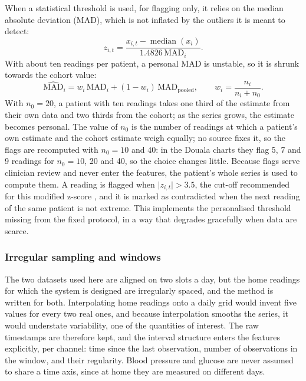 When a statistical threshold is used, for flagging only, it relies on the median absolute deviation (MAD), which is not inflated by the outliers it is meant to detect:
\begin{equation}
  z_{i,t} = \frac{x_{i,t} - \operatorname{median}(x_i)}{1.4826\,\mathrm{MAD}_i}.
\end{equation}
With about ten readings per patient, a personal MAD is unstable, so it is shrunk towards the cohort value:
\begin{equation}
  \widehat{\mathrm{MAD}}_i = w_i\,\mathrm{MAD}_i + (1-w_i)\,\mathrm{MAD}_{\text{pooled}},
  \qquad w_i = \frac{n_i}{n_i + n_0}.
\end{equation}
With $n_0 = 20$, a patient with ten readings takes one third of the estimate from their own data and two thirds from the cohort; as the series grows, the estimate becomes personal. The value of $n_0$ is the number of readings at which a patient's own estimate and the cohort estimate weigh equally; no source fixes it, so the flags are recomputed with $n_0 = 10$ and $40$: in the Douala charts they flag 5, 7 and 9 readings for $n_0 = 10$, 20 and 40, so the choice changes little. Because flags serve clinician review and never enter the features, the patient's whole series is used to compute them. A reading is flagged when $\lvert z_{i,t}\rvert > 3.5$, the cut-off recommended for this modified z-score \parencite{iglewicz1993}, and it is marked as contradicted when the next reading of the same patient is not extreme. This implements the personalised threshold missing from the fixed protocol, in a way that degrades gracefully when data are scarce.

\subsubsection{Irregular sampling and windows}\label{sec:irregular}\label{sec:windows}\label{sec:interval-features}\label{sec:window-length}\label{sec:overlap}

The two datasets used here are aligned on two slots a day, but the home readings for which the system is designed are irregularly spaced, and the method is written for both. Interpolating home readings onto a daily grid would invent five values for every two real ones, and because interpolation smooths the series, it would understate variability, one of the quantities of interest. The raw timestamps are therefore kept, and the interval structure enters the features explicitly, per channel: time since the last observation, number of observations in the window, and their regularity. Blood pressure and glucose are never assumed to share a time axis, since at home they are measured on different days.

